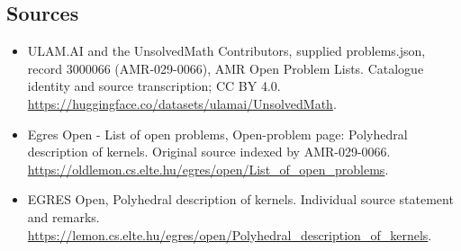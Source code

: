 \documentclass[11pt,a4paper]{article}
\begin{document}
\subsection{Sources}
\begin{itemize}
\item[S1] ULAM.AI and the UnsolvedMath Contributors, supplied problems.json, record 3000066 (AMR-029-0066), AMR Open Problem Lists. Catalogue identity and source transcription; CC BY 4.0.
\url{https://huggingface.co/datasets/ulamai/UnsolvedMath}.
\item[S2] Egres Open - List of open problems, Open-problem page: Polyhedral description of kernels. Original source indexed by AMR-029-0066.
\url{https://oldlemon.cs.elte.hu/egres/open/List_of_open_problems}.
\item[S3] EGRES Open, Polyhedral description of kernels. Individual source statement and remarks.
\url{https://lemon.cs.elte.hu/egres/open/Polyhedral_description_of_kernels}.
\end{itemize}
\end{document}
